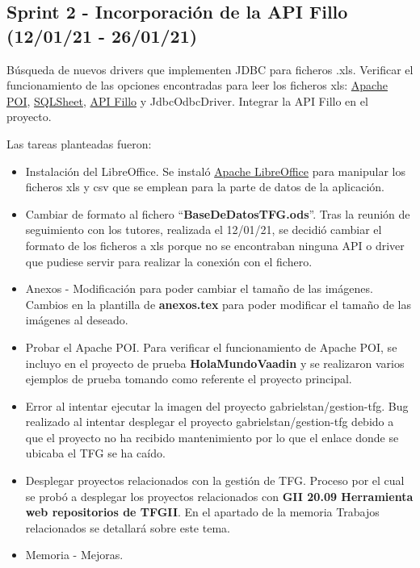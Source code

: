 
\subsection{Sprint 2 - Incorporación de la API Fillo (12/01/21 - 26/01/21)}
Búsqueda de nuevos drivers que implementen JDBC para ficheros .xls. Verificar el funcionamiento de las opciones encontradas para leer los ficheros xls: \href{https://poi.apache.org/}{Apache POI}, \href{https://code.google.com/archive/p/sqlsheet/}{SQLSheet}, \href{https://codoid.com/fillo/}{API Fillo} y JdbcOdbcDriver. Integrar la API Fillo en el proyecto. 

Las tareas planteadas fueron:
\begin{itemize}
	\item Instalación del LibreOffice. 
		Se instaló \href{https://es.libreoffice.org/}{Apache LibreOffice} para manipular los ficheros xls y csv que se emplean para la parte de datos de la aplicación.
	\item Cambiar de formato al fichero ``\textbf{BaseDeDatosTFG.ods}''. 
		Tras la reunión de seguimiento con los tutores, realizada el 12/01/21, se decidió cambiar el formato de los ficheros a xls porque no se encontraban ninguna API o driver que pudiese servir para realizar la conexión con el fichero.
	\item Anexos - Modificación para poder cambiar el tamaño de las imágenes.
		Cambios en la plantilla de \textbf{anexos.tex} para poder modificar el tamaño de las imágenes al deseado.
	\item Probar el Apache POI. 
		Para verificar el funcionamiento de Apache POI, se incluyo en el proyecto de prueba \textbf{HolaMundoVaadin} y se realizaron varios ejemplos de prueba tomando como referente el proyecto principal.
	\item Error al intentar ejecutar la imagen del proyecto gabrielstan/gestion-tfg. 
		Bug realizado al intentar desplegar el proyecto  gabrielstan/gestion-tfg debido a que el proyecto no ha recibido mantenimiento por lo que el enlace donde se ubicaba el TFG se ha caído. 
	\item Desplegar proyectos relacionados con la gestión de TFG. 
		Proceso por el cual se probó a desplegar los proyectos relacionados con \textbf{GII 20.09 Herramienta web repositorios de TFGII}. En el apartado de la memoria Trabajos relacionados se detallará sobre este tema. 
	\item Memoria - Mejoras.

\end{itemize}
